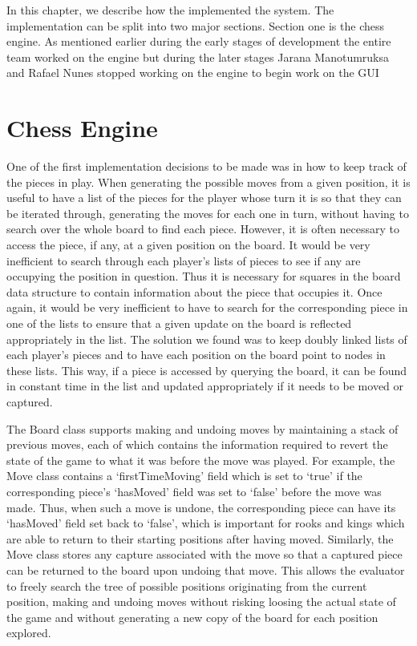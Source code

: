\documentclass{l3proj}
\begin{document}
	In this chapter, we describe how the implemented the system. The implementation can be split into two major sections. Section one is the chess engine. As mentioned earlier during the early stages of development the entire team worked on the engine but during the later stages Jarana Manotumruksa and Rafael Nunes stopped working on the engine to begin work on the GUI 

\section{Chess Engine}

One of the first implementation decisions to be made was in how to keep track of the pieces in play. When generating the possible moves from a given position, it is useful to have a list of the pieces for the player whose turn it is so that they can be iterated through, generating the moves for each one in turn, without having to search over the whole board to find each piece. However, it is often necessary to access the piece, if any, at a given position on the board. It would be very inefficient to search through each player’s lists of pieces to see if any are occupying the position in question. Thus it is necessary for squares in the board data structure to contain information about the piece that occupies it. Once again, it would be very inefficient to have to search for the corresponding piece in one of the lists to ensure that a given update on the board is reflected appropriately in the list. The solution we found was to keep doubly linked lists of each player’s pieces and to have each position on the board point to nodes in these lists. This way, if a piece is accessed by querying the board, it can be found in constant time in the list and updated appropriately if it needs to be moved or captured.

The Board class supports making and undoing moves by maintaining a stack of previous moves, each of which contains the information required to revert the state of the game to what it was before the move was played. For example, the Move class contains a ‘firstTimeMoving’ field which is set to ‘true’ if the corresponding piece’s ‘hasMoved’ field was set to ‘false’ before the move was made. Thus, when such a move is undone, the corresponding piece can have its ‘hasMoved’ field set back to ‘false’, which is important for rooks and kings which are able to return to their starting positions after having moved. Similarly, the Move class stores any capture associated with the move so that a captured piece can be returned to the board upon undoing that move. This allows the evaluator to freely search the tree of possible positions originating from the current position, making and undoing moves without risking loosing the actual state of the game and without generating a new copy of the board for each position explored. \\
\end{document}
